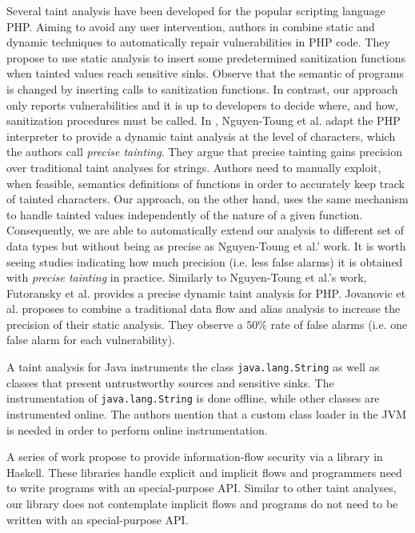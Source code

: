 \documentclass[oribibl]{llncs}
\begin{document}
Several taint analysis have been developed for the popular
scripting language PHP. 
Aiming to avoid any user intervention, 
authors in \cite{WebSSARI} combine static and dynamic
techniques to automatically repair vulnerabilities in PHP code. 
They propose to use static analysis to insert some predetermined 
sanitization functions when tainted values  
reach sensitive sinks. 
Observe that the semantic 
of programs is changed by inserting calls to sanitization functions. 
In contrast, our approach only reports vulnerabilities and it is up to developers
to decide where, and how, sanitization procedures must be called.
In \cite{Nguyen05}, 
Nguyen-Toung et al. adapt the PHP interpreter to provide a dynamic 
taint analysis at the level of characters, which the authors 
call \emph{precise tainting}. 
They argue that precise tainting gains precision over traditional 
taint analyses for strings.
Authors need to manually  
exploit, when feasible, semantics definitions of functions 
in order to accurately keep track of tainted characters. 
Our approach, on the other hand, uses the same mechanism to 
handle tainted values 
independently of the nature of a given function. Consequently, 
we are able to automatically extend our analysis to 
different set of data types but without being as precise as 
Nguyen-Toung et al.' work. 
It is worth seeing studies indicating 
how much precision (i.e. less false alarms) 
it is obtained with \emph{precise tainting} in practice.
Similarly to Nguyen-Toung et al.'s work,
Futoransky \cite{Futo07} 
et al. provides a precise dynamic taint analysis for PHP.
Jovanovic et al. \cite{Jovanovic06pixy:a} 
proposes to combine a traditional data flow and alias 
analysis to increase the precision of their static analysis.
They observe a $50\%$ rate of false alarms (i.e. one false alarm for 
each vulnerability).

A taint analysis for Java \cite{Haldar05dynamictaint} instruments
the class \texttt{java.lang.String} as well as  classes that 
present untrustworthy sources and sensitive sinks. 
The instrumentation of \texttt{java.lang.String} is done offline, 
while other classes are instrumented online. The authors 
mention that a custom class loader in the JVM is needed in order 
to perform online instrumentation.

A series of work 
\cite{PengLi+:Arrows,Tsai+:Library,Russo+:Haskell08} propose
to provide information-flow security via a library in Haskell. 
These libraries handle explicit and implicit flows and programmers
need to write programs with an special-purpose API.
Similar to other taint analyses, 
our library does not contemplate implicit flows %
and programs do not need to be written 
with an special-purpose API. 
\end{document}
